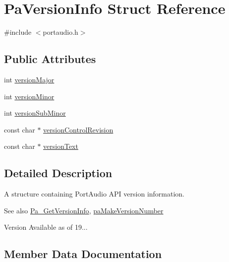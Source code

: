 \hypertarget{struct_pa_version_info}{}\section{Pa\+Version\+Info Struct Reference}
\label{struct_pa_version_info}


{\ttfamily \#include $<$portaudio.\+h$>$}

\subsection*{Public Attributes}
\begin{DoxyCompactItemize}
\item 
int \hyperlink{struct_pa_version_info_aae9ff4383171955022ebd26c0c0d4d2e}{version\+Major}
\item 
int \hyperlink{struct_pa_version_info_aee2f42cc57f0a018481d73e016722952}{version\+Minor}
\item 
int \hyperlink{struct_pa_version_info_aa789c4034fc38c91ffecb4f81fc3ae6b}{version\+Sub\+Minor}
\item 
const char $\ast$ \hyperlink{struct_pa_version_info_a4f8c2b786c9d5013e978e1218ad9ab22}{version\+Control\+Revision}
\item 
const char $\ast$ \hyperlink{struct_pa_version_info_ab876696c6563c35fdcb8c18f77ff12f5}{version\+Text}
\end{DoxyCompactItemize}


\subsection{Detailed Description}
A structure containing Port\+Audio A\+PI version information. \begin{DoxySeeAlso}{See also}
\hyperlink{portaudio_8h_ad74adc9406a64c3fb13c228c3381a121}{Pa\+\_\+\+Get\+Version\+Info}, \hyperlink{portaudio_8h_ac20e3ac459960f140910d94b5a61125e}{pa\+Make\+Version\+Number} 
\end{DoxySeeAlso}
\begin{DoxyVersion}{Version}
Available as of 19... 
\end{DoxyVersion}


\subsection{Member Data Documentation}
\mbox{\label{struct_pa_version_info_a4f8c2b786c9d5013e978e1218ad9ab22}} 
